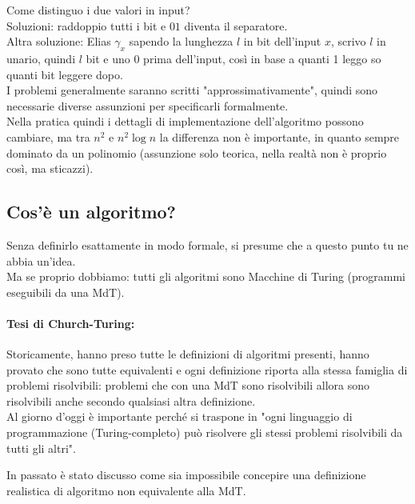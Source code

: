 Come distinguo i due valori in input?  \\

Soluzioni: raddoppio tutti i bit e $01$ diventa il separatore. \\

Altra soluzione: Elias $\gamma_x$ sapendo la lunghezza $l$ in bit dell'input $x$, scrivo $l$ in unario, quindi $l$ bit e uno $0$ prima dell'input, così in base a quanti 1 leggo so quanti bit leggere dopo.  \\

I problemi generalmente saranno scritti "approssimativamente", quindi sono necessarie diverse assunzioni per specificarli formalmente.\\

Nella pratica quindi i dettagli di implementazione dell'algoritmo possono cambiare, ma tra $n^2$ e $n^2 \log n$ la differenza non è importante, in quanto sempre dominato da un polinomio (assunzione solo teorica, nella realtà non è proprio così, ma sticazzi).

\newpage

\subsection{Cos'è un algoritmo?}
Senza definirlo esattamente in modo formale, si presume che a questo punto tu ne abbia un'idea.\\

Ma se proprio dobbiamo: tutti gli algoritmi sono Macchine di Turing (programmi eseguibili da una MdT). \\

\paragraph{Tesi di Church-Turing:} Storicamente, hanno preso tutte le definizioni di algoritmi presenti, hanno provato che sono tutte equivalenti e ogni definizione riporta alla stessa famiglia di problemi risolvibili: problemi che con una MdT sono risolvibili allora sono risolvibili anche secondo qualsiasi altra definizione.\\

Al giorno d'oggi è importante perché si traspone in "ogni linguaggio di programmazione (Turing-completo) può risolvere gli stessi problemi risolvibili da tutti gli altri". 

In passato è stato discusso come sia impossibile concepire una definizione realistica di algoritmo non equivalente alla MdT.\\

